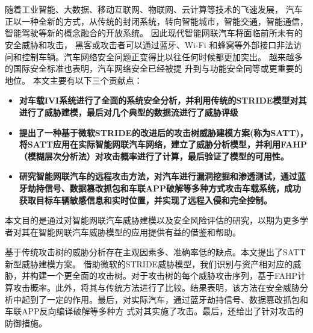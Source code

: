 \vspace{-2.5cm}
\chapter*{\xiaosan {}}
\hspace{-0.5cm}

随着工业智能、大数据、移动互联网、物联网、云计算等技术的飞速发展，
汽车正以一种全新的方式，从传统的封闭系统，转向智能城市，智能交通，智能通信，智能驾驶等新的概念融合的开放系统。
因此现代智能网联汽车将面临前所未有的安全威胁和攻击，
黑客或攻击者可以通过蓝牙、Wi-Fi 和蜂窝等外部接口非法访问和控制车辆。汽车网络安全问题正变得比以往任何时候都更加突出。
越来越多的国际安全标准也表明，汽车网络安全已经被提
升到与功能安全同等或更重要的地位。
本文主要有以下三个贡献点：
\begin{itemize}
    \item \textbf{对车载IVI系统进行了全面的系统安全分析，并利用传统的STRIDE模型对其进行了威胁建模，最后对几个典型的数据流进行了威胁评级}
    \item \textbf{提出了一种基于微软STRIDE的改进后的攻击树威胁建模方案(称为SATT)，将SATT应用在实际智能网联汽车网络，建立了威胁分析模型，并利用FAHP（模糊层次分析法）对攻击概率进行了计算，最后验证了模型的可用性。}
    \item \textbf{研究智能网联汽车的远程攻击方法，对汽车进行漏洞挖掘和渗透测试，通过蓝牙劫持信号、数据篡改抓包和车联APP破解等多种方式攻击车载系统，成功获取目标车辆敏感信息和实时位置，并实现了远程入侵和完全控制。}    
\end{itemize}

本文目的是通过对智能网联汽车威胁建模以及安全风险评估的研究，以期为更多学者对其在智能网联汽车威胁模型的应用提供有益的借鉴和帮助。

基于传统攻击树的威胁分析存在主观因素多、准确率低的缺点。本文提出了SATT新型威胁建模方案。
借助微软的STRIDE威胁模型，我们识别与资产相对应的威胁，并构建一个更全面的攻击树。对于攻击树的每个威胁攻击序列，基于FAHP计算攻击概率。此外，将其与传统方法进行了比较。结果表明，该方法在安全威胁分析中起到了一定的作用。最后，对实际汽车，通过蓝牙劫持信号、数据篡改抓包和车联APP反向编译破解等多种方
式对其实施了攻击。最后，还给出了针对攻击的防御措施。
\newline
{} 